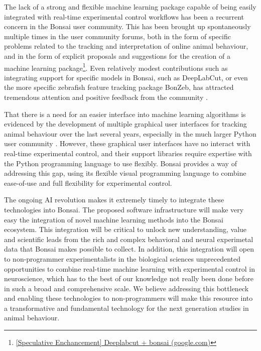 The lack of a strong and
flexible machine learning package capable of being easily integrated with
real-time experimental control workflows has been a recurrent concern in the
Bonsai user community. This has been brought up spontaneously multiple times in
the user community forums, both in the form of specific problems related to the
tracking and interpretation of online animal behaviour, and in the form of
explicit proposals and suggestions for the creation of a machine learning
package\footnote{\href{https://groups.google.com/g/bonsai-users/c/BZ3zOOdv_1c/m/x6OP75frBQAJ?utm_medium=email&utm_source=footer&pli=1}{[Speculative
Enchancement] Deeplabcut + bonsai (google.com)}}. Even
relatively modest contributions such as integrating support for specific models
in Bonsai, such as DeepLabCut, or even the more specific zebrafish feature
tracking package BonZeb, has attracted tremendous attention and positive
feedback from the community \citep[e.g.,][]{kaneEtAl20,guilbeaultEtAl21}.

That there is a need for an easier interface into machine learning algorithms
is evidenced by the development of multiple graphical user interfaces for
tracking animal behaviour over the last several years, especially in the much
larger Python user community
\citep[e.g.,][]{walterAndCouzin21,guilbeaultEtAl21}. However, these graphical
user interfaces have no interact with real-time experimental control, and
their support libraries require expertise with the Python programming language
to use flexibly. Bonsai provides a way of addressing this gap, using its
flexible visual programming language to combine ease-of-use and full
flexibility for experimental control.

The ongoing AI revolution makes it extremely timely to integrate these
technologies into Bonsai. The proposed software infrastructure will make very
easy the integration of novel machine learning methods into the Bonsai
ecosystem. This integration will be critical to unlock new understanding, value
and scientific leads from the rich and complex behavioral and neural
experimetal data that Bonsai makes possible to collect. In addition, this
integration will open to non-programmer experimentalists in the biological
sciences unprecedented opportunities to combine real-time machine learning with
experimental control in neuroscience, which has to the best of our knowledge
not really been done before in such a broad and comprehensive scale. We believe
addressing this bottleneck and enabling these technologies to non-programmers
will make this resource into a transformative and fundamental technology for
the next generation studies in animal behaviour.

